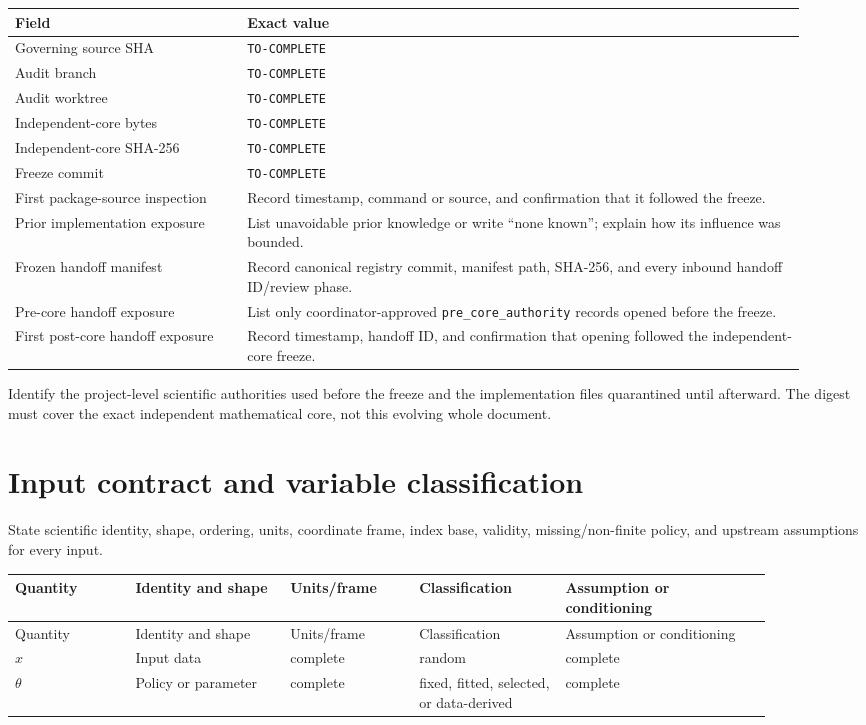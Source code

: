 \documentclass[11pt]{article}
\newcommand{\code}[1]{\nolinkurl{#1}}
\newcommand{\AuditGoverningSHA}{TO-COMPLETE}
\newcommand{\AuditBranch}{TO-COMPLETE}
\newcommand{\AuditWorktree}{TO-COMPLETE}
\newcommand{\AuditCorePath}{TO-COMPLETE}
\newcommand{\AuditCoreSHA}{TO-COMPLETE}
\newcommand{\AuditCoreFreezeCommit}{TO-COMPLETE}
\begin{document}
\begin{longtable}{L{0.27\linewidth}L{0.65\linewidth}}
\toprule
Field & Exact value\\
\midrule
Governing source SHA & \code{\AuditGoverningSHA}\\
Audit branch & \code{\AuditBranch}\\
Audit worktree & \code{\AuditWorktree}\\
Independent-core bytes & \code{\AuditCorePath}\\
Independent-core SHA-256 & \code{\AuditCoreSHA}\\
Freeze commit & \code{\AuditCoreFreezeCommit}\\
First package-source inspection & Record timestamp, command or source, and
confirmation that it followed the freeze.\\
Prior implementation exposure & List unavoidable prior knowledge or write
``none known''; explain how its influence was bounded.\\
Frozen handoff manifest & Record canonical registry commit, manifest path,
SHA-256, and every inbound handoff ID/review phase.\\
Pre-core handoff exposure & List only coordinator-approved
\code{pre_core_authority} records opened before the freeze.\\
First post-core handoff exposure & Record timestamp, handoff ID, and
confirmation that opening followed the independent-core freeze.\\
\bottomrule
\end{longtable}

Identify the project-level scientific authorities used before the freeze and
the implementation files quarantined until afterward. The digest must cover
the exact independent mathematical core, not this evolving whole document.

\section{Input contract and variable classification}

State scientific identity, shape, ordering, units, coordinate frame, index
base, validity, missing/non-finite policy, and upstream assumptions for every
input.

\begin{longtable}{L{0.14\linewidth}L{0.18\linewidth}L{0.15\linewidth}L{0.17\linewidth}L{0.24\linewidth}}
\toprule
Quantity & Identity and shape & Units/frame & Classification & Assumption or
conditioning\\
\midrule
\endfirsthead
\toprule
Quantity & Identity and shape & Units/frame & Classification & Assumption or
conditioning\\
\midrule
\endhead
\(x\) & Input data & complete & random & complete\\
\(\theta\) & Policy or parameter & complete & fixed, fitted, selected, or
data-derived & complete\\
\bottomrule
\end{longtable}
\end{document}

